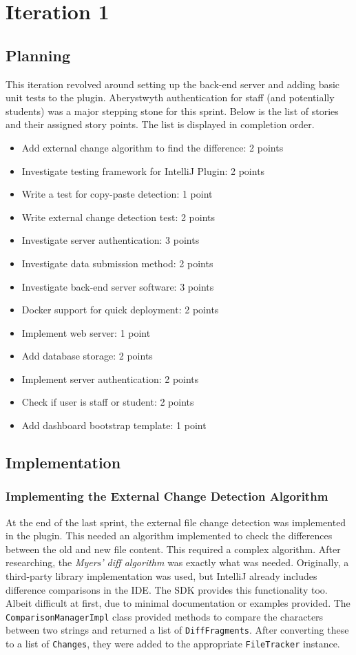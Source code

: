 \chapter{Iteration 1}
\label{it:1}
\section{Planning}
This iteration revolved around setting up the back-end server and adding basic unit tests to the plugin. Aberystwyth authentication for staff (and potentially students) was a major stepping stone for this sprint. Below is the list of stories and their assigned story points. The list is displayed in completion order.

\begin{itemize}
\item Add external change algorithm to find the difference: 2 points
\item Investigate testing framework for IntelliJ Plugin: 2 points
\item Write a test for copy-paste detection: 1 point
\item Write external change detection test: 2 points
\item Investigate server authentication: 3 points
\item Investigate data submission method: 2 points
\item Investigate back-end server software: 3 points
\item Docker support for quick deployment: 2 points
\item Implement web server: 1 point
\item Add database storage: 2 points
\item Implement server authentication: 2 points
\item Check if user is staff or student: 2 points
\item Add dashboard bootstrap template: 1 point
\end{itemize}

\section{Implementation}
\subsection{Implementing the External Change Detection Algorithm}
At the end of the last sprint, the external file change detection was implemented in the plugin. This needed an algorithm implemented to check the differences between the old and new file content. This required a complex algorithm. After researching, the \textit{Myers' diff algorithm} was exactly what was needed. Originally, a third-party library implementation was used, but IntelliJ already includes difference comparisons in the IDE. The SDK provides this functionality too. Albeit difficult at first, due to minimal documentation or examples provided. The \texttt{ComparisonManagerImpl} class provided methods to compare the characters between two strings and returned a list of \texttt{DiffFragments}. After converting these to a list of \texttt{Changes}, they were added to the appropriate \texttt{FileTracker} instance.

